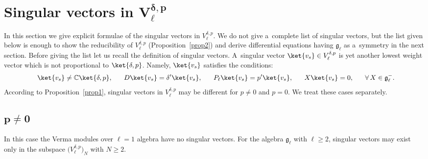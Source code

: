 \documentclass[pdftex]{sigma}
\numberwithin{equation}{section}
\begin{document}
\section[Singular vectors in $V^{\delta,p}_{\ell}$]{Singular vectors in $\boldsymbol{V^{\delta,p}_{\ell}}$}
\label{Sec:SV}

In this section we give explicit formulae of the singular vectors in $ V^{\delta,p}_{\ell}$.
We do not give a~complete list of singular vectors, but the list given below is enough to show the reducibility of $V^{\delta,p}_{\ell}$ (Proposition~\ref{prop2}) and derive dif\/ferential equations having ${\mathfrak g}_{\ell}$ as
a~symmetry in the next section.
Before giving the list let us recall the def\/inition of singular vectors.
A~singular vector $\ket{v_s} \in V^{\delta,p}_{\ell}$ is yet another lowest weight vector which is not proportional to
$\ket{\delta,p}$.
Namely, $ \ket{v_s} $ satisf\/ies the conditions:
\begin{gather}
    \ket{v_s} \neq {\mathbb C} \ket{\delta,p},
\qquad\!\!
    D \ket{v_s} = \delta' \ket{v_s},
\qquad\!\!
P_{\ell} \ket{v_s} = p' \ket{v_s},
\qquad\!\!
X \ket{v_s} = 0,
\qquad\!\!
\forall \,  X \in {\mathfrak g}_{\ell}^-.\!\!\!
\label{SV-def}
\end{gather}
According to Proposition~\ref{prop1}, singular vectors in $V^{\delta,p}_{\ell}$ may be dif\/ferent for $p \neq 0$ and
$p = 0$.
We treat these cases separately.

\subsection[$p \neq 0$]{$\boldsymbol{p \neq 0}$}

In this case the Verma modules over $ \ell = 1 $ algebra have no singular vectors.
For the algebra $ {\mathfrak g}_{\ell} $ with $ \ell \geq 2 $, singular vectors may exist only in the subspace $
\big(V^{\delta,p}_{\ell}\big)_N $ with $ N \geq 2$.
\end{document}
